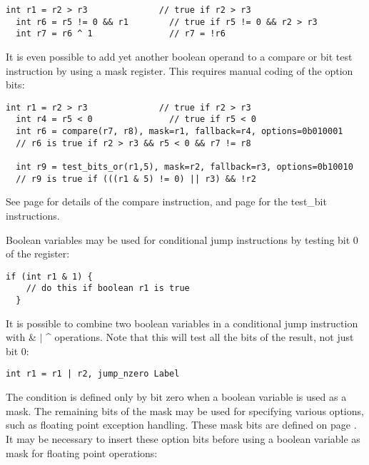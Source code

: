 \documentclass[forwardcom.tex]{subfiles}
\begin{document}
\begin{lstlisting}[frame=single]
  int r1 = r2 > r3              // true if r2 > r3
  int r6 = r5 != 0 && r1        // true if r5 != 0 && r2 > r3
  int r7 = r6 ^ 1               // r7 = !r6
\end{lstlisting}
\vv

It is even possible to add yet another boolean operand to a compare or bit test instruction by using a mask register. This requires manual coding of the option bits:

\begin{lstlisting}[frame=single]
  int r1 = r2 > r3              // true if r2 > r3
  int r4 = r5 < 0               // true if r5 < 0
  int r6 = compare(r7, r8), mask=r1, fallback=r4, options=0b010001
  // r6 is true if r2 > r3 && r5 < 0 && r7 != r8
  
  int r9 = test_bits_or(r1,5), mask=r2, fallback=r3, options=0b10010
  // r9 is true if (((r1 & 5) != 0) || r3) && !r2
\end{lstlisting}
\vv

See page \pageref{table:compareInstruction} for details of the compare instruction, and page \pageref{table:testBitInstruction} for the test\_bit instructions.
\vv

Boolean variables may be used for conditional jump instructions by testing bit 0 of the register:
\begin{lstlisting}[frame=single]
  if (int r1 & 1) {
    // do this if boolean r1 is true
  }
\end{lstlisting}
\vv

It is possible to combine two boolean variables in a conditional jump instruction with \hspace{2mm} \& \hspace{2mm} $\vert$ \hspace{2mm} \^{} \hspace{2mm} operations. Note that this will test all the bits of the result, not just bit 0:

\begin{lstlisting}[frame=single]
  int r1 = r1 | r2, jump_nzero Label
\end{lstlisting}
\vv

The condition is defined only by bit zero when a boolean variable is used as a mask. The remaining bits of the mask may be used for specifying various options, such as floating point exception handling. These mask bits are defined on page \pageref{table:maskBits}. It may be necessary to insert these option bits before using a boolean variable as mask for floating point operations:
\end{document}
